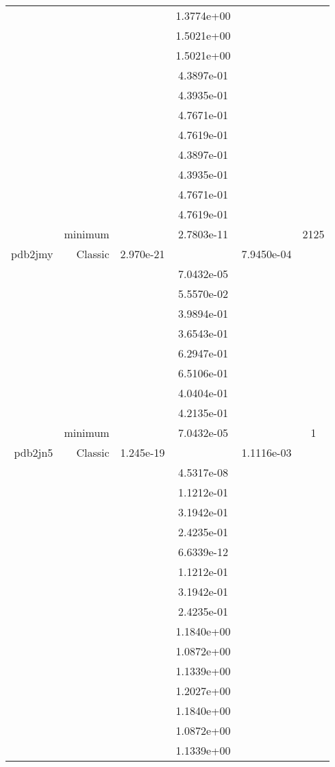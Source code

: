 \begin{xltabular}{\textwidth}{r|rS[table-format=1.3e+2]S[table-format=1.4e+2]S[table-format=1.4e+2]S[table-format=-1.5]}
&  &  & 1.3774e+00 & & \\
&  &  & 1.5021e+00 & & \\
&  &  & 1.5021e+00 & & \\
&  &  & 4.3897e-01 & & \\
&  &  & 4.3935e-01 & & \\
&  &  & 4.7671e-01 & & \\
&  &  & 4.7619e-01 & & \\
&  &  & 4.3897e-01 & & \\
&  &  & 4.3935e-01 & & \\
&  &  & 4.7671e-01 & & \\
&  &  & 4.7619e-01 & & \\
& minimum &  & 2.7803e-11 & & 2125 \\  \addlinespace
pdb2jmy & Classic & 2.970e-21 &  & 7.9450e-04 & \\
&  &  & 7.0432e-05 & & \\
&  &  & 5.5570e-02 & & \\
&  &  & 3.9894e-01 & & \\
&  &  & 3.6543e-01 & & \\
&  &  & 6.2947e-01 & & \\
&  &  & 6.5106e-01 & & \\
&  &  & 4.0404e-01 & & \\
&  &  & 4.2135e-01 & & \\
& minimum &  & 7.0432e-05 & & 1 \\  \addlinespace
pdb2jn5 & Classic & 1.245e-19 &  & 1.1116e-03 & \\
&  &  & 4.5317e-08 & & \\
&  &  & 1.1212e-01 & & \\
&  &  & 3.1942e-01 & & \\
&  &  & 2.4235e-01 & & \\
&  &  & 6.6339e-12 & & \\
&  &  & 1.1212e-01 & & \\
&  &  & 3.1942e-01 & & \\
&  &  & 2.4235e-01 & & \\
&  &  & 1.1840e+00 & & \\
&  &  & 1.0872e+00 & & \\
&  &  & 1.1339e+00 & & \\
&  &  & 1.2027e+00 & & \\
&  &  & 1.1840e+00 & & \\
&  &  & 1.0872e+00 & & \\
&  &  & 1.1339e+00 & & \\

\end{xltabular}
